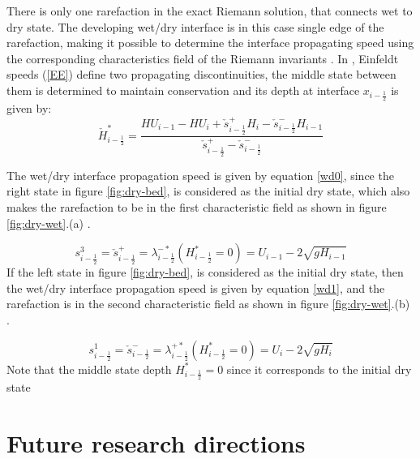 \documentclass[10pt,a4paper]{article}
\begin{document}
{	
	There is only one rarefaction in the exact Riemann solution, that connects wet to dry state. The developing wet/dry interface is in this case single edge of the rarefaction, making it possible to determine the interface propagating speed using the corresponding characteristics field of the Riemann invariants \cite{le-ge-be:2011}. In  \citet{george2006finite,ge:2008}, Einfeldt speeds (\eqref{EE})  define two propagating discontinuities, the  middle state between them is determined to maintain conservation and its depth at interface $x_{i-\frac{1}{2}}$ is given by:
	\begin{equation}
		\check{H}^{*}_{i-\frac{1}{2}} = \frac{HU_{i-1} -HU_{i} + \check{s}_{i-\frac{1}{2}}^{+}H_{i} -\check{s}_{i-\frac{1}{2}}^{-} H_{i-1}  }{\check{s}_{i-\frac{1}{2}}^{+} - \check{s}_{i-\frac{1}{2}}^{-}  }
	\end{equation}
	
	The wet/dry interface propagation  speed  is given by equation \eqref{wd0}, since the right state in figure \ref{fig:dry-bed}, is considered as the initial dry state, which also makes the rarefaction to be in the first characteristic field as shown in figure \ref{fig:dry-wet}.(a)  \cite{ge:2008}.
	
	\begin{equation}
		s_{i-\frac{1}{2}}^{3} = \check{s}_{i-\frac{1}{2}}^{+} = \lambda_{i-\frac{1}{2}}^{-*}(H^{*}_{i-\frac{1}{2}}=0)= U_{i-1} - 2\sqrt{gH_{i-1}}
		\label{wd0}
	\end{equation}
	If the left state in figure \ref{fig:dry-bed}, is considered as the initial dry state, then the  wet/dry interface propagation  speed  is given by equation \eqref{wd1}, and the  rarefaction is in the second characteristic field  as shown in figure \ref{fig:dry-wet}.(b)  \cite{ge:2008}.
	
	\begin{equation}
		s_{i-\frac{1}{2}}^{1} = \check{s}_{i-\frac{1}{2}}^{-} = \lambda_{i-\frac{1}{2}}^{+*}(H^{*}_{i-\frac{1}{2}}=0)= U_{i} - 2\sqrt{gH_{i}}
		\label{wd1}
	\end{equation}
	Note that the middle state depth $H^{*}_{i-\frac{1}{2}}=0$ since it corresponds to the initial dry state
	} 


	\section{ Future research directions}
\end{document}
